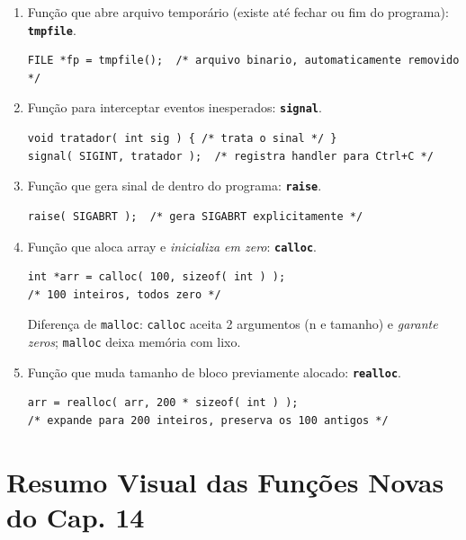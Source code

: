 \documentclass[12pt,a4paper]{article}
\begin{document}
\begin{respostabox}
\begin{enumerate}[label=\textbf{\alph*)}]
\item Função que abre arquivo temporário (existe até fechar ou fim do programa):
\textbf{\texttt{tmpfile}}.
\begin{lstlisting}
FILE *fp = tmpfile();  /* arquivo binario, automaticamente removido */
\end{lstlisting}

\item Função para interceptar eventos inesperados: \textbf{\texttt{signal}}.
\begin{lstlisting}
void tratador( int sig ) { /* trata o sinal */ }
signal( SIGINT, tratador );  /* registra handler para Ctrl+C */
\end{lstlisting}

\item Função que gera sinal de dentro do programa: \textbf{\texttt{raise}}.
\begin{lstlisting}
raise( SIGABRT );  /* gera SIGABRT explicitamente */
\end{lstlisting}

\item Função que aloca array e \textit{inicializa em zero}:
\textbf{\texttt{calloc}}.
\begin{lstlisting}
int *arr = calloc( 100, sizeof( int ) );
/* 100 inteiros, todos zero */
\end{lstlisting}
Diferença de \texttt{malloc}: \texttt{calloc} aceita 2 argumentos (n e
tamanho) e \textit{garante zeros}; \texttt{malloc} deixa memória com lixo.

\item Função que muda tamanho de bloco previamente alocado:
\textbf{\texttt{realloc}}.
\begin{lstlisting}
arr = realloc( arr, 200 * sizeof( int ) );
/* expande para 200 inteiros, preserva os 100 antigos */
\end{lstlisting}

\end{enumerate}
\end{respostabox}

\newpage

\section*{Resumo Visual das Funções Novas do Cap. 14}
\end{document}
